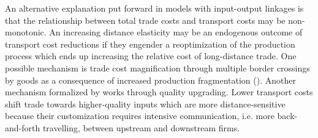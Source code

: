 \documentclass[12pt,twoside,a4paper,notitlepage]{article}
\begin{document}
An alternative explanation put forward in models with input-output linkages is that the relationship between total trade costs and transport costs may be non-monotonic.
An increasing distance elasticity may be an endogenous outcome of transport cost reductions if they engender a reoptimization of the production process which ends up increasing the relative cost of long-distance trade.
One possible mechanism is trade cost magnification through multiple border crossings by goods as a consequence of increased production fragmentation (\cite{Yi2010,Daudin2011,Noguera2012}).
Another mechanism formalized by \cite{Duranton2008} works through quality upgrading.
Lower transport costs shift trade towards higher-quality inputs which are more distance-sensitive because their customization requires intensive communication, i.e.
more back-and-forth travelling, between upstream and downstream firms.
\end{document}
